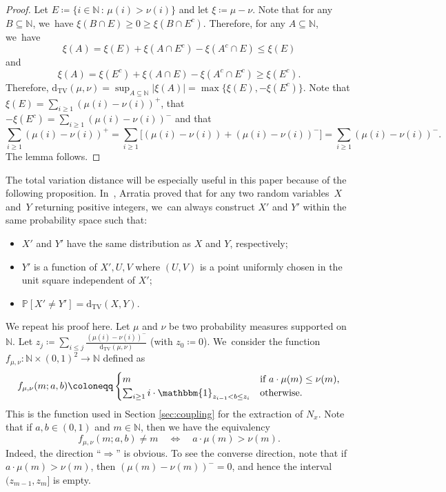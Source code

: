 \documentclass[10pt]{amsart}
\newcommand{\NN}{\mathbb{N}}
\newcommand{\PP}{\mathbb{P}}
\newcommand{\one}{\mathbbm{1}}
\newcommand{\dtv}{\mathrm{d}_{\mathrm{TV}}}
\newcommand{\bg}{\big}
\theoremstyle{plain}
\theoremstyle{definition}
\begin{document}
\begin{proof}
Let $E \coloneqq \{i \in \NN \, : \, \mu(i) > \nu(i)\}$ and let $\xi\coloneqq \mu - \nu$. Note that for any $B\subseteq \NN$, we~have $\xi(B\cap E) \ge 0 \ge \xi(B\cap E^c)$. Therefore, for any $A \subseteq \NN$, we~have
\[
\xi(A) = \xi(E) + \xi(A \cap E^c) - \xi(A^c \cap E) \le \xi(E)
\]
and
\[
\xi(A) = \xi(E^c) + \xi(A \cap E) - \xi(A^c \cap E^c) \ge \xi(E^c).
\]
Therefore, $\dtv(\mu, \nu) = \sup_{A \subseteq \NN} |\xi(A)| = \max\{\xi(E), -\xi(E^c)\}$. Note that $\xi(E) = \sum_{i \ge 1} (\mu(i) - \nu(i))^+$, that $-\xi(E^c) = \sum_{i \ge 1} (\mu(i) - \nu(i))^-$ and that
\[
\sum_{i \ge 1} (\mu(i) - \nu(i))^+ = \sum_{i \ge 1} \bg[(\mu(i) - \nu(i)) + (\mu(i) - \nu(i))^-\bg] = \sum_{i \ge 1} (\mu(i) - \nu(i))^-.
\]
The lemma follows.
\end{proof}

The total variation distance will be especially useful in this paper because of the following proposition. In~\cite[\S 3.8]{Arratia02}, Arratia proved that for any two random variables~$X$ and~$Y$ returning positive integers, we~can always construct $X'$ and $Y'$ within the same probability space such that:
\begin{itemize}
\item $X'$ and $Y'$ have the same distribution as $X$ and $Y$, respectively;

\item $Y'$ is a function of $X', U, V$ where $(U, V)$ is a point uniformly chosen in the unit square independent of $X'$;

\item $\PP[X' \ne Y'] = \dtv(X, Y)$.
\end{itemize}
We repeat his proof here. Let $\mu$ and $\nu$ be two probability measures supported on $\NN$. Let $z_j \coloneqq \sum_{i \le j} \frac{(\mu(i) - \nu(i))^-}{\dtv(\mu, \nu)}$ (with $z_0 \coloneqq 0$). We~consider the function $f_{\mu, \nu}\colon \NN \times (0, 1)^2 \to \NN$ defined as
\[
f_{\mu, \nu}(m; a, b) \coloneqq \begin{cases}
m &\text{if $a \cdot \mu(m) \le \nu(m)$,} \\
\sum_{i \ge 1} i \cdot \one_{z_{i-1} < b \le z_i} &\text{otherwise.}
\end{cases}
\]
This is the function used in Section \ref{sec:coupling} for the extraction of $N_x$.
Note that if $a,b\in(0,1)$ and $m\in\NN$, then we have the equivalency
\begin{equation}
\label{eq:f TV property}
f_{\mu, \nu}(m; a, b) \ne m\quad\iff\quad a\cdot \mu(m) > \nu(m).
\end{equation}
Indeed, the direction ``$\Rightarrow$'' is obvious. To see the converse direction, note that if \hbox{$a\cdot\mu(m)>\nu(m)$}, then $(\mu(m)-\nu(m))^-=0$, and hence the interval $(z_{m-1},z_m]$ is empty.
\end{document}
